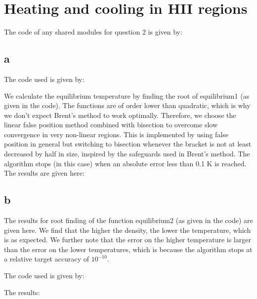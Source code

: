\section{Heating and cooling in HII regions}

The code of any shared modules for question 2 is given by:




\subsection{a}

The code used is given by:


We calculate the equilibrium temperature by finding the root of equilibrium1 (as given in the code).
The functions are of order lower than quadratic, which is why we don't expect Brent's method
to work optimally. Therefore, we choose the linear false position method combined with bisection to overcome slow convergence in very non-linear regions.
This is implemented by using false position in general but switching to bisection whenever the bracket is not at least decreased by half in size, inspired
by the safeguards used in Brent's method. The algorithm stops (in this case) when an absolute error less than 0.1 K is reached. The results are given here:




\subsection{b}

The results for root finding of the function equilibrium2 (as given in the code) are given here. 
We find that the higher the density, the lower the temperature, which is as expected.
We further note that the error on the higher temperature is larger than the error on the lower temperatures, 
which is because the algorithm stops at a relative target accuracy of $10^{-10}$.

The code used is given by:


The results:
